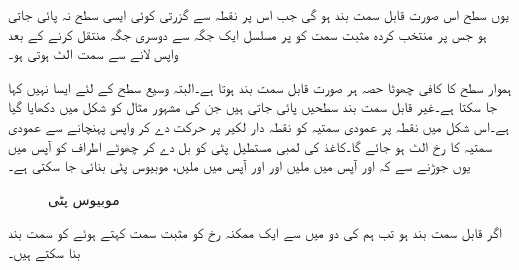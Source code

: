 یوں سطح  اس صورت قابل سمت بند ہو گی جب اس پر نقطہ  سے گزرتی کوئی ایسی سطح  نہ پائی جاتی ہو جس پر منتخب کردہ مثبت سمت کو  پر مسلسل ایک جگہ سے دوسری جگہ منتقل کرنے کے بعد واپس  لانے سے سمت الٹ ہوتی ہو۔    

ہموار سطح کا کافی چھوٹا حصہ ہر صورت قابل سمت بند ہوتا ہے۔البتہ وسیع سطح کے لئے ایسا نہیں کہا جا سکتا ہے۔غیر قابل سمت بند سطحیں پائی جاتی ہیں جن کی مشہور مثال  کو شکل  میں دکھایا گیا ہے۔اس شکل میں نقطہ  پر عمودی سمتیہ کو نقطہ دار لکیر پر  حرکت دے کر  واپس  پہنچانے سے  عمودی سمتیہ کا رخ الٹ ہو جائے گا۔کاغذ کی لمبی مستطیل پٹی کو بل دے کر چھوٹے اطراف کو آپس میں یوں جوڑنے سے کہ  اور  آپس میں ملیں اور  اور  آپس میں ملیں، موبیوس پٹی بنائی جا سکتی ہے۔
\begin{figure}
\centering
\begin{subfigure}{0.45\textwidth}
\centering
{}%
\end{subfigure} \hfill
\begin{subfigure}{0.45\textwidth}
\centering
{}
\end{subfigure}
\caption{موبیوس پٹی}
\label{شکل_خطی_تکمل_موبیوس_پٹی}
\end{figure}
اگر  قابل سمت بند ہو تب ہم  کی دو میں سے ایک ممکنہ رخ کو مثبت سمت کہتے ہوئے  کو سمت بند بنا سکتے ہیں۔

